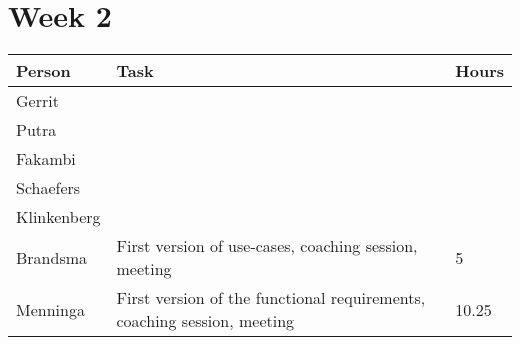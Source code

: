 \section{Week 2}
\begin{tabular}{p{} p{} p{}}
    \textbf{Person} & \textbf{Task} & \textbf{Hours} \\ \hline
	Gerrit &  &  \\ \hline
	Putra &  &  \\ \hline
	Fakambi & & \\ \hline
	Schaefers &  & \\ \hline
	Klinkenberg & & \\ \hline
	Brandsma & First version of use-cases, coaching session, meeting & 5 \\ \hline
	Menninga & First version of the functional requirements, coaching session, meeting & 10.25 \\ \hline
\end{tabular}